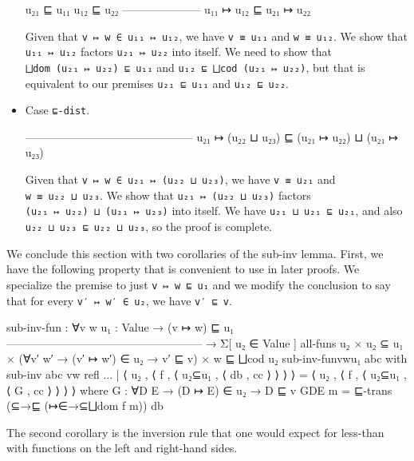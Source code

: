 \begin{itemize}
  \begin{myDisplay}
    u₂₁ ⊑ u₁₁  u₁₂ ⊑ u₂₂
    ---------------------
    u₁₁ ↦ u₁₂ ⊑ u₂₁ ↦ u₂₂
  \end{myDisplay}

  Given that \texttt{v\ ↦\ w\ ∈\ u₁₁\ ↦\ u₁₂}, we have
  \texttt{v\ ≡\ u₁₁} and \texttt{w\ ≡\ u₁₂}. We show that
  \texttt{u₁₁\ ↦\ u₁₂} factors \texttt{u₂₁\ ↦\ u₂₂} into itself. We need
  to show that \texttt{⨆dom\ (u₂₁\ ↦\ u₂₂)\ ⊑\ u₁₁} and
  \texttt{u₁₂\ ⊑\ ⨆cod\ (u₂₁\ ↦\ u₂₂)}, but that is equivalent to our
  premises \texttt{u₂₁\ ⊑\ u₁₁} and \texttt{u₁₂\ ⊑\ u₂₂}.
\item
  Case \texttt{⊑-dist}.

  \begin{myDisplay}
    ---------------------------------------------
    u₂₁ ↦ (u₂₂ ⊔ u₂₃) ⊑ (u₂₁ ↦ u₂₂) ⊔ (u₂₁ ↦ u₂₃)
  \end{myDisplay}

  Given that \texttt{v\ ↦\ w\ ∈\ u₂₁\ ↦\ (u₂₂\ ⊔\ u₂₃)}, we have
  \texttt{v\ ≡\ u₂₁} and \texttt{w\ ≡\ u₂₂\ ⊔\ u₂₃}. We show that
  \texttt{u₂₁\ ↦\ (u₂₂\ ⊔\ u₂₃)} factors
  \texttt{(u₂₁\ ↦\ u₂₂)\ ⊔\ (u₂₁\ ↦\ u₂₃)} into itself. We have
  \texttt{u₂₁\ ⊔\ u₂₁\ ⊑\ u₂₁}, and also
  \texttt{u₂₂\ ⊔\ u₂₃\ ⊑\ u₂₂\ ⊔\ u₂₃}, so the proof is complete.
\end{itemize}

We conclude this section with two corollaries of the sub-inv lemma.
First, we have the following property that is convenient to use in later
proofs. We specialize the premise to just \texttt{v\ ↦\ w\ ⊑\ u₁} and we
modify the conclusion to say that for every \texttt{v′\ ↦\ w′\ ∈\ u₂},
we have \texttt{v′\ ⊑\ v}.

\begin{fence}
\begin{code}
sub-inv-fun : ∀{v w u₁ : Value}
    → (v ↦ w) ⊑ u₁
      -----------------------------------------------------
    → Σ[ u₂ ∈ Value ] all-funs u₂ × u₂ ⊆ u₁
        × (∀{v′ w′} → (v′ ↦ w′) ∈ u₂ → v′ ⊑ v) × w ⊑ ⨆cod u₂
sub-inv-fun{v}{w}{u₁} abc
    with sub-inv abc {v}{w} refl
... | ⟨ u₂ , ⟨ f , ⟨ u₂⊆u₁ , ⟨ db , cc ⟩ ⟩ ⟩ ⟩ =
      ⟨ u₂ , ⟨ f , ⟨ u₂⊆u₁ , ⟨ G , cc ⟩ ⟩ ⟩ ⟩
   where G : ∀{D E} → (D ↦ E) ∈ u₂ → D ⊑ v
         G{D}{E} m = ⊑-trans (⊆→⊑ (↦∈→⊆⨆dom f m)) db
\end{code}
\end{fence}

The second corollary is the inversion rule that one would expect for
less-than with functions on the left and right-hand sides.

